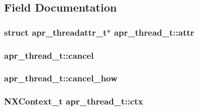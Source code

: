 \subsection{Field Documentation}
\subsubsection[{\texorpdfstring{attr}{attr}}]{\setlength{\rightskip}{0pt plus 5cm}struct {\bf apr\+\_\+threadattr\+\_\+t}$\ast$ apr\+\_\+thread\+\_\+t\+::attr}\hypertarget{structapr__thread__t_ab941acbf2b6ded301d0a1d5dbc311870}{}\label{structapr__thread__t_ab941acbf2b6ded301d0a1d5dbc311870}
\subsubsection[{\texorpdfstring{cancel}{cancel}}]{ apr\+\_\+thread\+\_\+t\+::cancel}\hypertarget{structapr__thread__t_a77d772ca0c18485107e7a5c2b778c30f}{}\label{structapr__thread__t_a77d772ca0c18485107e7a5c2b778c30f}
\subsubsection[{\texorpdfstring{cancel\+\_\+how}{cancel_how}}]{ apr\+\_\+thread\+\_\+t\+::cancel\+\_\+how}\hypertarget{structapr__thread__t_a6244b09e234f465572d41e7c456f90fe}{}\label{structapr__thread__t_a6244b09e234f465572d41e7c456f90fe}
\subsubsection[{\texorpdfstring{ctx}{ctx}}]{\setlength{\rightskip}{0pt plus 5cm}N\+X\+Context\+\_\+t apr\+\_\+thread\+\_\+t\+::ctx}\hypertarget{structapr__thread__t_a34de6673457138356c44fbd3dc662904}{}\label{structapr__thread__t_a34de6673457138356c44fbd3dc662904}
